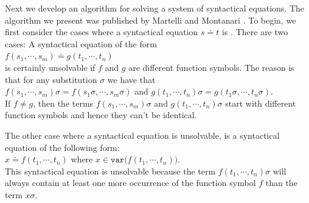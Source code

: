 Next we develop an algorithm for solving a system of syntactical equations.
The algorithm we present was published by Martelli and Montanari
\cite{martelli:1982}.  
To begin, we first consider the cases where a syntactical equation $s \doteq t$ is .
There are two cases: A syntactical equation of the form
\\[0.2cm]
\hspace*{1.3cm}
$f(s_1,\cdots,s_m) \doteq g(t_1,\cdots, t_n)$ \\[0.2cm]
is certainly unsolvable if  $f$ and $g$ are different function symbols. The reason is that for any substitution
$\sigma$ we have that \\[0.2cm]
\hspace*{1.0cm} $f(s_1,\cdots,s_m)\sigma = f(s_1\sigma,\cdots,s_m\sigma)$ \quad and \quad
                $g(t_1,\cdots, t_n)\sigma = g(t_1\sigma,\cdots,t_n\sigma)$. \\[0.2cm]
If $f \not = g$, then the terms  $f(s_1,\cdots,s_m)\sigma$ and $g(t_1,\cdots, t_n)\sigma$ start with different
function symbols and hence they can't be identical.

The other case where a syntactical equation is unsolvable, is a syntactical equation of the following form:
\\[0.2cm]
\hspace*{1.3cm}
$x \doteq f(t_1,\cdots,t_n)$  \quad where $x \in \texttt{var}\big(f(t_1,\cdots,t_n)\big)$.
\\[0.2cm]
This syntactical equation is unsolvable because the term $f(t_1,\cdots,t_n)\sigma$ will always contain at least one more
occurrence of the function symbol $f$ than the term $x\sigma$.

